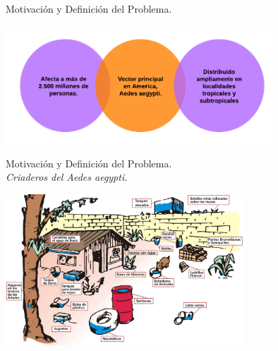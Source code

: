 \begin{frame}[t]{Motivación y Definición del Problema.}
  \begin{center}
    \includegraphics[width=10cm]{./graphics/dengue-intro.png}
  \end{center}
\end{frame}


\begin{frame}[t]{Motivación y Definición del Problema.\\\textit{Criaderos del Aedes aegypti.}}
\begin{center}
    \includegraphics[width=9cm]{./graphics/criaderos.jpg}
    \end{center}
\end{frame}





